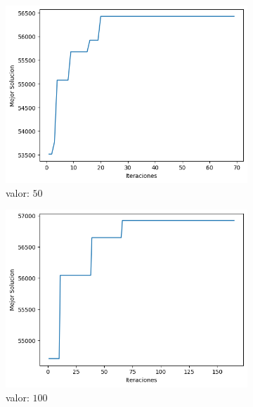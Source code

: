 \documentclass[a4paper,12pt]{article}
\begin{document}
	\begin{figure}[H]
		\centering
		\begin{subfigure}{0.24\textwidth}
			\centering
			\includegraphics[width=\textwidth]{include/parada/50/f_ast.png}
			\caption{valor: $50$}
		\end{subfigure}
		\hfill
		\begin{subfigure}{0.24\textwidth}
			\centering
			\includegraphics[width=\textwidth]{include/parada/100/f_ast.png}
			\caption{valor: $100$}
		\end{subfigure}
		\hfill
		\begin{subfigure}{0.24\textwidth}
			\centering

\end{subfigure}
\end{figure}
\end{document}
